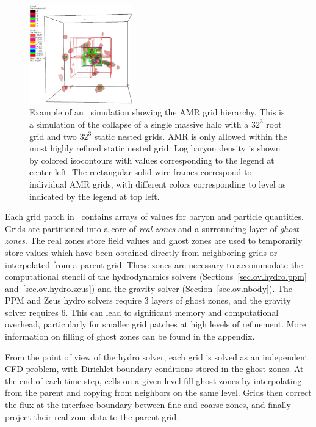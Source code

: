 \begin{figure}
\begin{center}
\includegraphics[width=0.4\textwidth]{figures/amr-hier-dens.eps}
\caption{Example of an \enzo\ simulation showing the AMR grid hierarchy.  
This is a simulation of the collapse of a single massive halo with a 
$32^3$ root grid and two $32^3$ static nested grids.  AMR is only allowed
within the most highly refined static nested grid.  Log baryon density is shown
by colored isocontours with values corresponding to the legend at center left.  
The rectangular solid wire frames correspond to individual 
AMR grids, with different colors corresponding to level as indicated by the
legend at top left.}
\label{fig.2.amrhierdens}
\end{center}
\end{figure}

Each grid patch in \enzo\ contains arrays of values for baryon and 
particle quantities.   Grids are 
partitioned into a core of \emph{real zones} and a surrounding layer 
of \emph{ghost zones}.  The real zones store field values and ghost 
zones are used to temporarily store values which have been obtained 
directly from neighboring grids or interpolated from a parent grid.  
These zones are necessary to accommodate the computational stencil of 
the hydrodynamics solvers (Sections~\ref{sec.ov.hydro.ppm} and~\ref{sec.ov.hydro.zeus}) 
and the gravity solver (Section~\ref{sec.ov.nbody}).  
The PPM and Zeus hydro solvers require 3 layers of ghost zones,  and the gravity
solver requires 6.  This can lead to significant memory 
and computational overhead, particularly for smaller grid patches
at high levels of refinement.  More information on filling of ghost
zones can be found in the appendix.

From the point of view of the hydro solver, each grid is solved as an
independent CFD problem, with Dirichlet boundary conditions stored in
the ghost zones.  At the end of each time step, cells on a given level
fill ghost zones by interpolating from the parent and copying from
neighbors on the same level.  Grids then correct the flux at the interface boundary between
fine and coarse zones, and finally project their real zone data to the
parent grid. 


